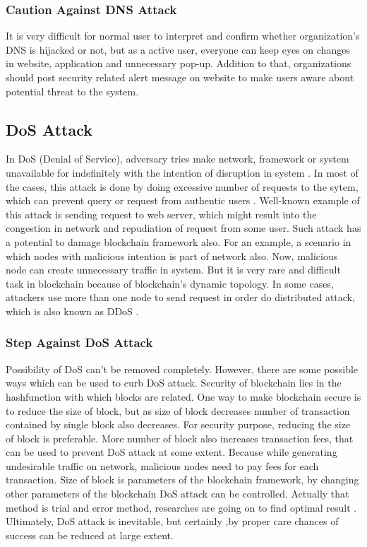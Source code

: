 \documentclass[a4paper,twoside,12pt]{report}
\begin{document}
\begin{spacing}{1.5}
\subsubsection{Caution Against DNS Attack}
It is very difficult for normal user to interpret and confirm whether organization's DNS is hijacked or not, but as a active user, everyone can keep eyes on changes in website, application and unnecessary pop-up. Addition to that, organizations should post security related alert message on website to make users aware about potential threat to the system.
\subsection{DoS Attack}
In DoS (Denial of Service), adversary tries make network, framework or system unavailable for indefinitely with the intention of disruption in system \cite{chao-yang_dos_2011}. In most of the cases, this attack is done by doing excessive number of requests to the sytem, which can prevent query or request from authentic users \cite{dos_wireless_singh_denial_2017}. Well-known example of this attack is sending request to web server, which might result into the congestion in network and repudiation of request from some user. Such attack has a potential to damage blockchain framework also. For an example, a scenario in which nodes with malicious intention is part of network also. Now, malicious node can create unnecessary traffic in system. But it is very rare and difficult task in blockchain because of blockchain's dynamic topology\cite{zaghloul_beginners_2018}. In some cases, attackers use more than one node to send request in order do distributed attack, which is also known as DDoS \cite{saad_exploring_2019}. 
\subsubsection{Step Against DoS Attack}
Possibility of DoS can't be removed completely. However, there are some possible ways which can be used to curb DoS attack. Security of blockchain lies in the hashfunction with which blocks are related. One way to make blockchain secure is to reduce the size of block, but as size of block decreases number of transaction contained by single block also decreases. For security purpose, reducing the size of block is preferable. More number of block also increases transaction fees, that can be used to prevent DoS attack at some extent. Because while generating undesirable traffic on network, malicious nodes need to pay fees for each transaction. Size of block is parameters of the blockchain framework, by changing other parameters of the blockchain DoS attack can be controlled. Actually that method is trial and error method, researches are going on to find optimal result \cite{zaghloul_beginners_2018}. Ultimately, DoS attack is inevitable, but certainly ,by proper care chances of success can be reduced at large extent.       

\end{spacing}
\end{document}
